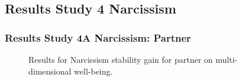 \documentclass[
  singlecolumn]{article}
\begin{document}
\begin{longtable}[]
\end{longtable}

\newpage{}

\subsection{Results Study 4
Narcissism}\label{results-study-4-narcissism}

\subsubsection{Results Study 4A Narcissism:
Partner}\label{results-study-4a-narcissism-partner}

\begin{figure}


\caption{\label{fig-results-narcissism-partner}Results for Narcissism
stability gain for partner on multi-dimensional well-being.}

\end{figure}%

\newpage{}
\end{document}
